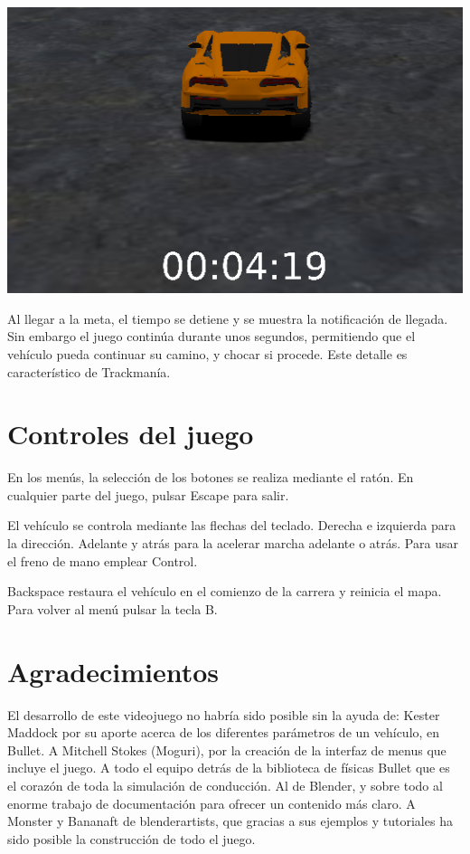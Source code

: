 \documentclass[11pt,a4paper,hidelinks]{article}
\begin{document}
\begin{center}
\includegraphics[scale=0.5]{hud}
\end{center}

Al llegar a la meta, el tiempo se detiene y se muestra la notificación de 
llegada. Sin embargo el juego continúa durante unos segundos, permitiendo que el 
vehículo pueda continuar su camino, y chocar si procede. Este detalle es 
característico de Trackmanía.

\section{Controles del juego}
En los menús, la selección de los botones se realiza mediante el ratón. En 
cualquier parte del juego, pulsar Escape para salir.

El vehículo se controla mediante las flechas del teclado. Derecha e izquierda 
para la dirección. Adelante y atrás para la acelerar marcha adelante o atrás.  
Para usar el freno de mano emplear Control.

Backspace restaura el vehículo en el comienzo de la carrera y reinicia el mapa.
Para volver al menú pulsar la tecla B.


\section{Agradecimientos}
El desarrollo de este videojuego no habría sido posible sin la ayuda de:
Kester Maddock por su aporte acerca de los diferentes parámetros de un vehículo, 
en Bullet. A Mitchell Stokes (Moguri), por la creación de la interfaz de menus 
que incluye el juego. A todo el equipo detrás de la biblioteca de físicas Bullet 
que es el corazón de toda la simulación de conducción. Al de Blender, y sobre 
todo al enorme trabajo de documentación para ofrecer un contenido más claro. A 
Monster y Bananaft de blenderartists, que gracias a sus ejemplos y tutoriales ha 
sido posible la construcción de todo el juego.
\end{document}
